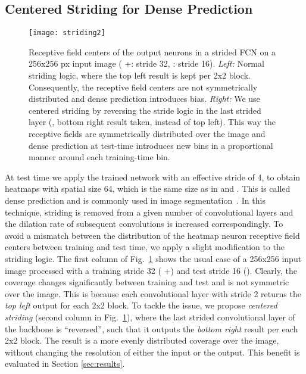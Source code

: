 \subsection{Centered Striding for Dense Prediction}

\begin{figure}[t]
\centering
\texttt{[image: striding2]}\\
\caption{Receptive field centers of the output neurons in a strided FCN on a 256x256 px input image ({\color{blue} +}: stride 32, {\color{darkgreen}}: stride 16).
\textit{Left:} Normal striding logic, where the top left result is kept per 2x2 block.
Consequently, the receptive field centers are not symmetrically distributed and dense prediction introduces bias.
\textit{Right:} We use centered striding by reversing the stride logic in the last strided layer (\ie, bottom right result taken, instead of top left).
This way the receptive fields are symmetrically distributed over the image and dense prediction at test-time introduces new bins in a proportional manner around each training-time bin.
}
\label{fig:striding}
\end{figure}
At test time we apply the trained network with an effective stride of 4, to obtain heatmaps with spatial size 64, which is the same size as in \cite{Sun18ECCV} and \cite{Pavlakos17CVPR}.
This is called dense prediction and is commonly used in image segmentation~\cite{Chen18PAMI}.
In this technique, striding is removed from a given number of convolutional layers and the dilation rate of subsequent convolutions is increased correspondingly.
To avoid a mismatch between the distribution of the heatmap neuron receptive field centers between training and test time, we apply a slight modification to the striding logic.
The first column of Fig.~\ref{fig:striding} shows the usual case of a 256x256 input image processed with a training stride 32 ({\color{blue} +}) and test stride 16 ({\color{darkgreen}}).
Clearly, the coverage changes significantly between training and test and is not symmetric over the image.
This is because each convolutional layer with stride 2 returns the \emph{top left} output for each 2x2 block.
To tackle the issue, we propose \textit{centered striding} (second column in Fig.~\ref{fig:striding}), where the last strided convolutional layer of the backbone is ``reversed'', such that it outputs the \emph{bottom right} result per each 2x2 block.
The result is a more evenly distributed coverage over the image, without changing the resolution of either the input or the output.
This benefit is evaluated in Section \ref{sec:results}.
